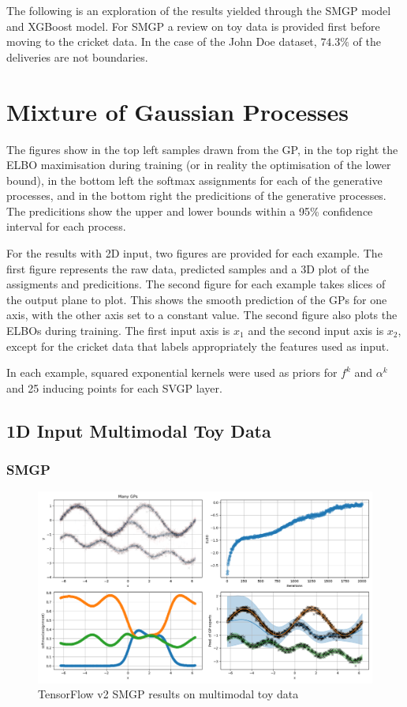 \documentclass[12pt,a4paper]{report}
\theoremstyle{definition}
\begin{document}
The following is an exploration of the results yielded through the SMGP model and XGBoost model.
For SMGP a review on toy data is provided first before moving to the cricket data.
In the case of the John Doe dataset, $74.3\%$ of the deliveries are not boundaries.

\section{Mixture of Gaussian Processes}

The figures show in the top left samples drawn from the GP, in the top right the ELBO maximisation during training (or in reality the optimisation of the lower bound), in the bottom left the softmax assignments for each of the generative processes, and in the bottom right the predicitions of the generative processes.
The predicitions show the upper and lower bounds within a 95\% confidence interval for each process. 

For the results with 2D input, two figures are provided for each example.
The first figure represents the raw data, predicted samples and a 3D plot of the assigments and predicitions.
The second figure for each example takes slices of the output plane to plot.
This shows the smooth prediction of the GPs for one axis, with the other axis set to a constant value.
The second figure also plots the ELBOs during training.
The first input axis is $x_{1}$ and the second input axis is $x_{2}$, except for the cricket data that labels appropriately the features used as input.

In each example, squared exponential kernels were used as priors for $f^k$ and $\alpha^k$ and 25 inducing points for each SVGP layer.  

\subsection{1D Input Multimodal Toy Data}

\subsubsection{SMGP}

\begin{figure}[H]
    \centering
    \includegraphics[width=\linewidth]{demo_tf2.png}
    \caption{TensorFlow v2 SMGP results on multimodal toy data}
    \label{fig:MultimodalSMGP}
\end{figure}
\end{document}
